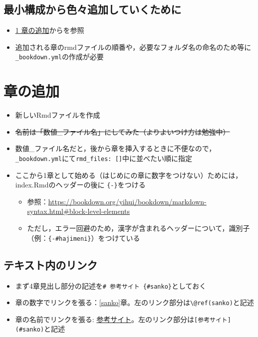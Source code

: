 \documentclass[xelatex, ja=standard, b5paper]{bxjsbook}
\providecommand{\tightlist}{%
  \setlength{\itemsep}{0pt}\setlength{\parskip}{0pt}}
\begin{document}
\hypertarget{hajime_add}{%
\section*{最小構成から色々追加していくために}\label{hajime_add}}

\begin{itemize}
\tightlist
\item
  \protect\hyperlink{intro}{1 章の追加}からを参照
\item
  追加される章のrmdファイルの順番や，必要なフォルダ名の命名のため等に\texttt{\_bookdown.yml}の作成が必要
\end{itemize}

\hypertarget{intro}{%
\chapter{章の追加}\label{intro}}

\begin{itemize}
\tightlist
\item
  新しいRmdファイルを作成
\item
  \sout{名前は「数値\_ファイル名」にしてみた（よりよいつけ方は勉強中）}
\item
  数値\_ファイル名だと，後から章を挿入するときに不便なので，\texttt{\_bookdown.yml}にて\texttt{rmd\_files:\ {[}{]}}中に並べたい順に指定
\item
  ここから1章として始める（はじめにの章に数字をつけない）ためには，index.Rmdのヘッダーの後に \texttt{\{-\}}をつける

  \begin{itemize}
  \tightlist
  \item
    参照：\url{https://bookdown.org/yihui/bookdown/markdown-syntax.html\#block-level-elements}
  \item
    ただし，エラー回避のため，漢字が含まれるヘッダーについて，識別子（例：\texttt{\{-\#hajimeni\}}）をつけている
  \end{itemize}
\end{itemize}

\hypertarget{intro_link}{%
\section{テキスト内のリンク}\label{intro_link}}

\begin{itemize}
\tightlist
\item
  まず4章見出し部分の記述を\texttt{\#\ 参考サイト\ \{\#sanko\}}としておく
\item
  章の数字でリンクを張る：\ref{sanko}章。左のリンク部分は\texttt{\textbackslash{}@ref(sanko)}と記述
\item
  章の名前でリンクを張る:
  \protect\hyperlink{sanko}{参考サイト}。左のリンク部分は\texttt{{[}参考サイト{]}(\#sanko)}と記述
\end{itemize}
\end{document}
